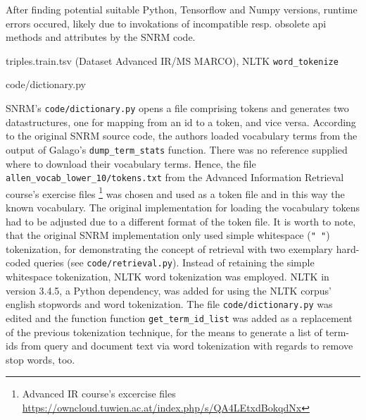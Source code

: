 After finding potential suitable Python, Tensorflow and Numpy versions, runtime errors occured, likely due to invokations of incompatible 
    resp. obsolete api methods and attributes by the SNRM code.



triples.train.tsv (Dataset Advanced IR/MS MARCO), NLTK \verb|word_tokenize|




code/dictionary.py




SNRM's \texttt{code/dictionary.py} opens a file comprising tokens and generates two datastructures, one for mapping from an id to a token, 
    and vice versa.
According to the original SNRM source code, the authors loaded vocabulary terms from the output of Galago's \verb|dump_term_stats| function.
There was no reference supplied where to download their vocabulary terms.
Hence, the file \verb|allen_vocab_lower_10/tokens.txt| from the Advanced Information Retrieval course's exercise files 
    \footnote{Advanced IR course's excercise files \url{https://owncloud.tuwien.ac.at/index.php/s/QA4LEtxdBokqdNx}}
    was chosen and used as a token file and in this way the known vocabulary.
The original implementation for loading the vocabulary tokens had to be adjusted due to a different format of the token file.
It is worth to note, that the original SNRM implementation only used simple whitespace (\verb|" "|) tokenization, for demonstrating
    the concept of retrieval with two exemplary hard-coded queries (see \texttt{code/retrieval.py}).
Instead of retaining the simple whitespace tokenization, NLTK word tokenization was employed.
NLTK in version 3.4.5, a Python dependency, was added for using the NLTK corpus' english stopwords and word tokenization.
The file \texttt{code/dictionary.py} was edited and the function function \verb|get_term_id_list| was added as a 
    replacement of the previous tokenization technique, for the means to generate a list of term-ids from 
    query and document text via word tokenization with regards to remove stop words, too.







